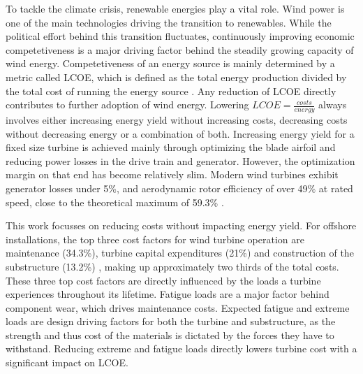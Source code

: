 \label{ch:intro}

To tackle the climate crisis, renewable energies play a vital role. Wind power is one of the main technologies driving the transition to renewables. While the political effort behind this transition fluctuates, continuously improving economic competetiveness is a major driving factor behind the steadily growing capacity of wind energy. Competetiveness of an energy source is mainly determined by a metric called \acf{LCOE}, which is defined as the total energy production divided by the total cost of running the energy source \cite{kostLevelizedCostElectricity2021}. Any reduction of \ac{LCOE} directly contributes to further adoption of wind energy. Lowering $LCOE = \frac{costs}{energy}$ always involves either increasing energy yield without increasing costs, decreasing costs without decreasing energy or a combination of both. Increasing energy yield for a fixed size turbine is achieved mainly through optimizing the blade airfoil and reducing power losses in the drive train and generator. However, the optimization margin on that end has become relatively slim. Modern wind turbines exhibit generator losses under 5\%, and aerodynamic rotor efficiency of over 49\% at rated speed, close to the theoretical maximum of 59.3\% \cite{bortolottiIEAWindTCP2019} \cite{raghebWindTurbinesTheory2011}. 

This work focusses on reducing costs without impacting energy yield. For offshore installations, the top three cost factors for wind turbine operation are maintenance (34.3\%), turbine capital expenditures (21\%) and construction of the substructure (13.2\%) \cite[Figure ES2]{stehly2019CostWind2020}, making up approximately two thirds of the total costs. These three top cost factors are directly influenced by the loads a turbine experiences throughout its lifetime. Fatigue loads are a major factor behind component wear, which drives maintenance costs. Expected fatigue and extreme loads are design driving factors for both the turbine and substructure, as the strength and thus cost of the materials is dictated by the forces they have to withstand. Reducing extreme and fatigue loads directly lowers turbine cost with a significant impact on \ac{LCOE}.

